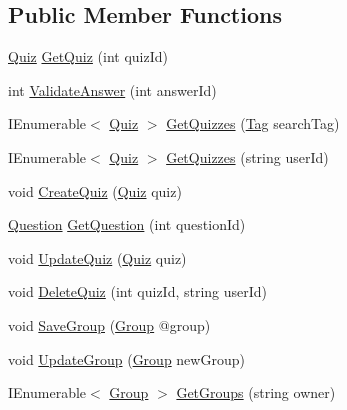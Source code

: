 \subsection*{Public Member Functions}
\begin{DoxyCompactItemize}
\item 
\hyperlink{class_website_1_1_models_1_1_quiz}{Quiz} \hyperlink{interface_website_1_1_controllers_1_1_i_quiz_model_ab26aefef338ae3a0f73b04572fa83a00}{Get\+Quiz} (int quiz\+Id)
\item 
int \hyperlink{interface_website_1_1_controllers_1_1_i_quiz_model_a555b513a5bbe1d8e42aa7320d5bbd7ab}{Validate\+Answer} (int answer\+Id)
\item 
I\+Enumerable$<$ \hyperlink{class_website_1_1_models_1_1_quiz}{Quiz} $>$ \hyperlink{interface_website_1_1_controllers_1_1_i_quiz_model_a42e7103961f230ff9d4aeb4d67177c7d}{Get\+Quizzes} (\hyperlink{class_website_1_1_models_1_1_tag}{Tag} search\+Tag)
\item 
I\+Enumerable$<$ \hyperlink{class_website_1_1_models_1_1_quiz}{Quiz} $>$ \hyperlink{interface_website_1_1_controllers_1_1_i_quiz_model_a34a7b0362c3bbea24539a1625df6c4f5}{Get\+Quizzes} (string user\+Id)
\item 
void \hyperlink{interface_website_1_1_controllers_1_1_i_quiz_model_af991ea155b25c86f1a01c7bec80f07d5}{Create\+Quiz} (\hyperlink{class_website_1_1_models_1_1_quiz}{Quiz} quiz)
\item 
\hyperlink{class_website_1_1_models_1_1_question}{Question} \hyperlink{interface_website_1_1_controllers_1_1_i_quiz_model_a635722276d52e7f732b30fc69915fade}{Get\+Question} (int question\+Id)
\item 
void \hyperlink{interface_website_1_1_controllers_1_1_i_quiz_model_a002612c78af09d40ba234b86a23a2bb2}{Update\+Quiz} (\hyperlink{class_website_1_1_models_1_1_quiz}{Quiz} quiz)
\item 
void \hyperlink{interface_website_1_1_controllers_1_1_i_quiz_model_a0b9fbc10c13200969b0a30b76dc819de}{Delete\+Quiz} (int quiz\+Id, string user\+Id)
\item 
void \hyperlink{interface_website_1_1_controllers_1_1_i_quiz_model_a017dbca7d1e29844fdcc94e6bfccf5cf}{Save\+Group} (\hyperlink{class_website_1_1_models_1_1_group}{Group} @group)
\item 
void \hyperlink{interface_website_1_1_controllers_1_1_i_quiz_model_aff0694ad4143ade3a56392ff943dcf39}{Update\+Group} (\hyperlink{class_website_1_1_models_1_1_group}{Group} new\+Group)
\item 
I\+Enumerable$<$ \hyperlink{class_website_1_1_models_1_1_group}{Group} $>$ \hyperlink{interface_website_1_1_controllers_1_1_i_quiz_model_a13d824cda6730c7264a98401ce9795f3}{Get\+Groups} (string owner)

\end{DoxyCompactItemize}

